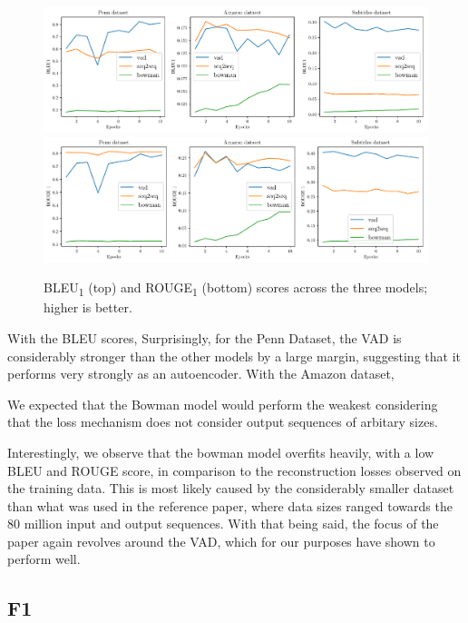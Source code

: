 \documentclass[12pt,twoside]{report}
\begin{document}
\begin{figure}[!ht]
	\centering
	\includegraphics[width=150mm]{results/bleu1.pdf}
	\includegraphics[width=150mm]{results/rouge_1.pdf}
	\caption{BLEU\textsubscript{1} (top) and ROUGE\textsubscript{1} (bottom) scores across the three models; higher is better.\label{r:bleu_rouge}}
  \end{figure}


With the BLEU scores, Surprisingly, for the Penn Dataset, the VAD is considerably stronger than the other models by a large margin, suggesting that it performs very strongly as an autoencoder. With the Amazon dataset, 


We expected that the Bowman model would perform the weakest considering that the loss mechanism does not consider output sequences of arbitary sizes.

Interestingly, we observe that the bowman model overfits heavily, with a low BLEU and ROUGE score, in comparison to the reconstruction losses observed on the training data. This is most likely caused by the considerably smaller dataset than what was used in the reference paper, where data sizes ranged towards the 80 million input and output sequences. With that being said, the focus of the paper again revolves around the VAD, which for our purposes have shown to perform well.

\subsection{F1}
\end{document}
